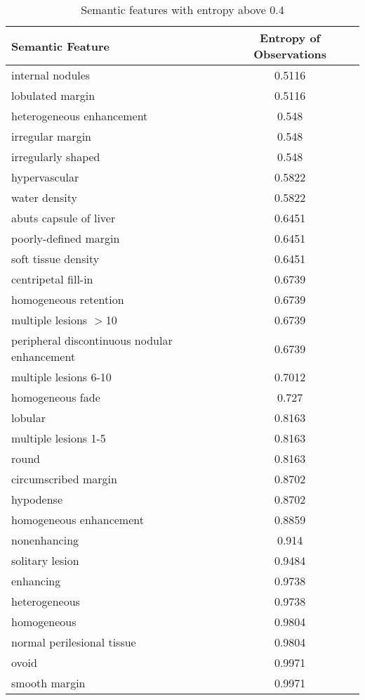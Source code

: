 \begin{center}
	\begin{table}[h!]
		\centering
		\begin{tabular}{|l|c|}
			\hline
			Semantic Feature & Entropy of Observations \\ \hline \hline
			internal nodules & 0.5116 \\ \hline
			lobulated margin & 0.5116 \\ \hline
			heterogeneous enhancement & 0.548 \\ \hline
			irregular margin & 0.548 \\ \hline
			irregularly shaped & 0.548 \\ \hline
			hypervascular & 0.5822 \\ \hline
			water density & 0.5822 \\ \hline
			abuts capsule of liver & 0.6451 \\ \hline
			poorly-defined margin & 0.6451 \\ \hline
			soft tissue density & 0.6451 \\ \hline
			centripetal fill-in & 0.6739 \\ \hline
			homogeneous retention & 0.6739 \\ \hline
			multiple lesions $>$10 & 0.6739 \\ \hline
			peripheral discontinuous nodular enhancement & 0.6739 \\ \hline
			multiple lesions 6-10 & 0.7012 \\ \hline
			homogeneous fade & 0.727 \\ \hline
			lobular & 0.8163 \\ \hline
			multiple lesions 1-5 & 0.8163 \\ \hline
			round & 0.8163 \\ \hline
			circumscribed margin & 0.8702 \\ \hline
			hypodense & 0.8702 \\ \hline
			homogeneous enhancement & 0.8859 \\ \hline
			nonenhancing & 0.914 \\ \hline
			solitary lesion & 0.9484 \\ \hline
			enhancing & 0.9738 \\ \hline
			heterogeneous & 0.9738 \\ \hline
			homogeneous & 0.9804 \\ \hline
			normal perilesional tissue & 0.9804 \\ \hline
			ovoid & 0.9971 \\ \hline
			smooth margin & 0.9971 \\ \hline
		\end{tabular}
		\label{table:semanticfeaturelist}
		\caption{Semantic features with entropy above 0.4}
	\end{table}
\end{center}